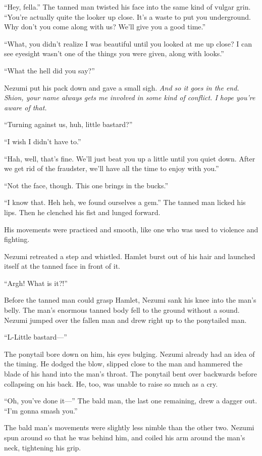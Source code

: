 ``Hey, fella.'' The tanned man twisted his face into the same kind of
vulgar grin. ``You're actually quite the looker up close. It's a waste
to put you underground. Why don't you come along with us? We'll give you
a good time.''

``What, you didn't realize I was beautiful until you looked at me up
close? I can see eyesight wasn't one of the things you were given, along
with looks.''

``What the hell did you say?''

Nezumi put his pack down and gave a small sigh. \emph{And so it goes in the
end. Shion, your name always gets me involved in some kind of conflict.
I hope you're aware of that.}

``Turning against us, huh, little bastard?''

``I wish I didn't have to.''

``Hah, well, that's fine. We'll just beat you up a little until you
quiet down. After we get rid of the fraudster, we'll have all the time
to enjoy with you.''

``Not the face, though. This one brings in the bucks.''

``I know that. Heh heh, we found ourselves a gem.'' The tanned man
licked his lips. Then he clenched his fist and lunged forward.

His movements were practiced and smooth, like one who was used to
violence and fighting.

Nezumi retreated a step and whistled. Hamlet burst out of his hair and
launched itself at the tanned face in front of it.

``Argh! What is it?!''

Before the tanned man could grasp Hamlet, Nezumi sank his knee into the
man's belly. The man's enormous tanned body fell to the ground without a
sound. Nezumi jumped over the fallen man and drew right up to the
ponytailed man.

``L-Little bastard---''

The ponytail bore down on him, his eyes bulging. Nezumi already had an
idea of the timing. He dodged the blow, slipped close to the man and
hammered the blade of his hand into the man's throat. The ponytail bent
over backwards before collapsing on his back. He, too, was unable to
raise so much as a cry.

``Oh, you've done it---'' The bald man, the last one remaining, drew a
dagger out. ``I'm gonna smash you.''

The bald man's movements were slightly less nimble than the other two.
Nezumi spun around so that he was behind him, and coiled his arm around
the man's neck, tightening his grip.

